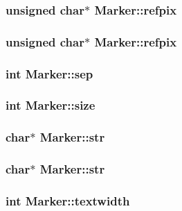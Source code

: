 \subsubsection{\setlength{\rightskip}{0pt plus 5cm}unsigned char$\ast$ \bf{Marker::refpix}}\label{structMarker_eb3839b73a85dadc6f11f6e3f443392e}


\subsubsection{\setlength{\rightskip}{0pt plus 5cm}unsigned char$\ast$ \bf{Marker::refpix}}\label{structMarker_eb3839b73a85dadc6f11f6e3f443392e}


\subsubsection{\setlength{\rightskip}{0pt plus 5cm}int \bf{Marker::sep}}\label{structMarker_97141e316dce5c6277f42b285001e89f}


\subsubsection{\setlength{\rightskip}{0pt plus 5cm}int \bf{Marker::size}}\label{structMarker_2ca66237318915e4c73c690465d65503}


\subsubsection{\setlength{\rightskip}{0pt plus 5cm}char$\ast$ \bf{Marker::str}}\label{structMarker_c4235f972206ab0904d3e91744fe954a}


\subsubsection{\setlength{\rightskip}{0pt plus 5cm}char$\ast$ \bf{Marker::str}}\label{structMarker_c4235f972206ab0904d3e91744fe954a}


\subsubsection{\setlength{\rightskip}{0pt plus 5cm}int \bf{Marker::textwidth}}\label{structMarker_7755db83d8500f5554e4753195463203}


